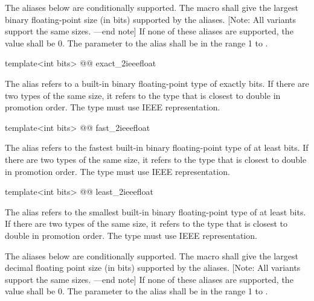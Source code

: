 \begin{addedblock}
The aliases below are conditionally supported. The macro  shall give the largest binary floating-point size (in bits) supported by the aliases. [Note: All variants support the same sizes. —end note] If none of these aliases are supported, the value shall be 0. The parameter to the alias shall be in the range 1 to .

\begin{itemdecl}
template<int bits> @@ exact_2ieeefloat
\end{itemdecl}

\begin{itemdescr}
The alias  refers to a built-in binary floating-point type of exactly  bits. If there are two types of the same size, it refers to the type that is closest to double in promotion order. The type must use IEEE representation.
\end{itemdescr}

\begin{itemdecl}
template<int bits> @@ fast_2ieeefloat
\end{itemdecl}

\begin{itemdescr}
The alias  refers to the fastest built-in binary floating-point type of at least  bits. If there are two types of the same size, it refers to the type that is closest to double in promotion order. The type must use IEEE representation.
\end{itemdescr}

\begin{itemdecl}
template<int bits> @@ least_2ieeefloat
\end{itemdecl}

\begin{itemdescr}
The alias  refers to the smallest built-in binary floating-point type of at least  bits. If there are two types of the same size, it refers to the type that is closest to double in promotion order. The type must use IEEE representation.
\end{itemdescr}

The aliases below are conditionally supported. The macro  shall give the largest decimal floating point size (in bits) supported by the aliases. [Note: All variants support the same sizes. —end note] If none of these aliases are supported, the value shall be 0. The parameter to the alias shall be in the range 1 to .


\end{addedblock}
